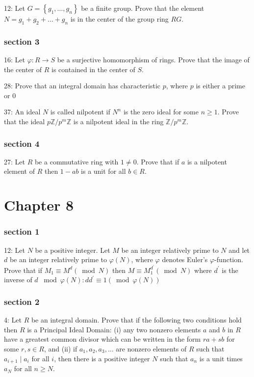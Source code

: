 \documentclass{article}
\begin{document}
12: Let $G=\left\{g_{1}, \ldots, g_{n}\right\}$ be a finite group. Prove that the element $N=g_{1}+g_{2}+\ldots+g_{n}$ is in the center of the group ring $R G$.

\subsubsection*{section 3}
16: Let $\varphi: R \rightarrow S$ be a surjective homomorphism of rings. Prove that the image of the center of $R$ is contained in the center of $S$. 

28: Prove that an integral domain has characteristic $p$, where $p$ is either a prime or 0

37: An ideal $N$ is called nilpotent if $N^{n}$ is the zero ideal for some $n \geq 1$. Prove that the ideal $p \mathbb{Z} / p^{m} \mathbb{Z}$ is a nilpotent ideal in the ring $\mathbb{Z} / p^{m} \mathbb{Z}$.

\subsubsection*{section 4}
27: Let $R$ be a commutative ring with $1 \neq 0$. Prove that if $a$ is a nilpotent element of $R$ then $1-a b$ is a unit for all $b \in R$.

\section*{Chapter 8}
\subsubsection*{section 1}
12: Let $N$ be a positive integer. Let $M$ be an integer relatively prime to $N$ and let $d$ be an integer relatively prime to $\varphi(N)$, where $\varphi$ denotes Euler's $\varphi$-function. Prove that if $M_{1} \equiv M^{d}(\bmod N)$ then $M \equiv M_{1}^{d^{\prime}}(\bmod N)$ where $d^{\prime}$ is the inverse of $d$ $\bmod \varphi(N): d d^{\prime} \equiv 1(\bmod \varphi(N))$

\subsubsection*{section 2}
4: Let $R$ be an integral domain. Prove that if the following two conditions hold then $R$ is a Principal Ideal Domain: (i) any two nonzero elements $a$ and $b$ in $R$ have a greatest common divisor which can be written in the form $r a+s b$ for some $r, s \in R$, and (ii) if $a_{1}, a_{2}, a_{3}, \ldots$ are nonzero elements of $R$ such that $a_{i+1} \mid a_{i}$ for all $i$, then there is a positive integer $N$ such that $a_{n}$ is a unit times $a_{N}$ for all $n \geq N$.
\end{document}
